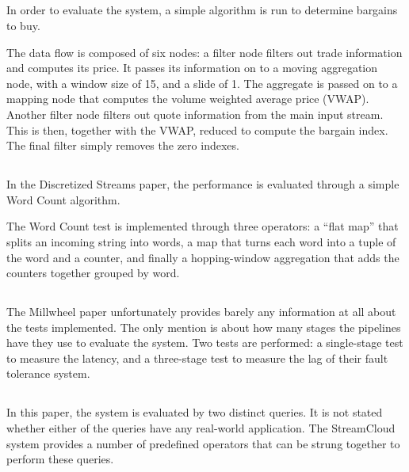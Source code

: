 \subsection{}
In order to evaluate the system, a simple algorithm is run to determine bargains to buy. \\


The data flow is composed of six nodes: a filter node filters out trade information and computes its price. It passes its information on to a moving aggregation node, with a window size of 15, and a slide of 1. The aggregate is passed on to a mapping node that computes the volume weighted average price (VWAP). Another filter node filters out quote information from the main input stream. This is then, together with the VWAP, reduced to compute the bargain index. The final filter simply removes the zero indexes.

\subsection{}
In the Discretized Streams paper, the performance is evaluated through a simple Word Count algorithm. \\


The Word Count test is implemented through three operators: a ``flat map'' that splits an incoming string into words, a map that turns each word into a tuple of the word and a counter, and finally a hopping-window aggregation that adds the counters together grouped by word.

\subsection{}
The Millwheel paper unfortunately provides barely any information at all about the tests implemented. The only mention is about how many stages the pipelines have they use to evaluate the system. Two tests are performed: a single-stage test to measure the latency, and a three-stage test to measure the lag of their fault tolerance system.

\subsection{}
In this paper, the system is evaluated by two distinct queries. It is not stated whether either of the queries have any real-world application. The StreamCloud system provides a number of predefined operators that can be strung together to perform these queries. \\

